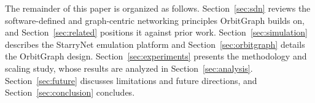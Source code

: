 The remainder of this paper is organized as follows.
Section~\ref{sec:sdn} reviews the software-defined and graph-centric networking
principles OrbitGraph builds on, and Section~\ref{sec:related} positions it
against prior work.
Section~\ref{sec:simulation} describes the StarryNet emulation platform and
Section~\ref{sec:orbitgraph} details the OrbitGraph design.
Section~\ref{sec:experiments} presents the methodology and scaling study, whose
results are analyzed in Section~\ref{sec:analysis}.
Section~\ref{sec:future} discusses limitations and future directions, and
Section~\ref{sec:conclusion} concludes.
